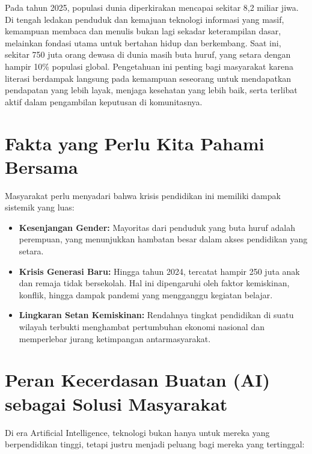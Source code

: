 \documentclass[
  letterpaper,
  DIV=11,
  numbers=noendperiod]{scrreprt}
\begin{document}
Pada tahun 2025, populasi dunia diperkirakan mencapai sekitar 8,2 miliar
jiwa. Di tengah ledakan penduduk dan kemajuan teknologi informasi yang
masif, kemampuan membaca dan menulis bukan lagi sekadar keterampilan
dasar, melainkan fondasi utama untuk bertahan hidup dan berkembang. Saat
ini, sekitar 750 juta orang dewasa di dunia masih buta huruf, yang
setara dengan hampir 10\% populasi global. Pengetahuan ini penting bagi
masyarakat karena literasi berdampak langsung pada kemampuan seseorang
untuk mendapatkan pendapatan yang lebih layak, menjaga kesehatan yang
lebih baik, serta terlibat aktif dalam pengambilan keputusan di
komunitasnya.

\section{Fakta yang Perlu Kita Pahami
Bersama}\label{fakta-yang-perlu-kita-pahami-bersama}

Masyarakat perlu menyadari bahwa krisis pendidikan ini memiliki dampak
sistemik yang luas:

\begin{itemize}
\item
  \textbf{Kesenjangan Gender:} Mayoritas dari penduduk yang buta huruf
  adalah perempuan, yang menunjukkan hambatan besar dalam akses
  pendidikan yang setara.
\item
  \textbf{Krisis Generasi Baru:} Hingga tahun 2024, tercatat hampir 250
  juta anak dan remaja tidak bersekolah. Hal ini dipengaruhi oleh faktor
  kemiskinan, konflik, hingga dampak pandemi yang mengganggu kegiatan
  belajar.
\item
  \textbf{Lingkaran Setan Kemiskinan:} Rendahnya tingkat pendidikan di
  suatu wilayah terbukti menghambat pertumbuhan ekonomi nasional dan
  memperlebar jurang ketimpangan antarmasyarakat.
\end{itemize}

\section{Peran Kecerdasan Buatan (AI) sebagai Solusi
Masyarakat}\label{peran-kecerdasan-buatan-ai-sebagai-solusi-masyarakat}

Di era Artificial Intelligence, teknologi bukan hanya untuk mereka yang
berpendidikan tinggi, tetapi justru menjadi peluang bagi mereka yang
tertinggal:
\end{document}

